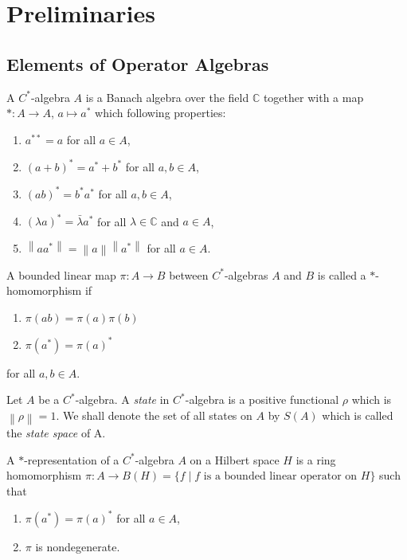 \chapter{Preliminaries}

\section{Elements of Operator Algebras}

A \(C^\ast\)-algebra \(A\) is a Banach algebra over the field \(\mathbb{C}\) together with a map \(\ast: A \to A\), \(a \mapsto a^\ast\) which following properties:
\begin{enumerate}
    \item \(a^{\ast\ast}=a\) for all \(a \in A\),
    \item \((a+b)^\ast=a^\ast+b^\ast\) for all \(a,b \in A\),
    \item \((ab)^\ast = b^\ast a^\ast\) for all \(a,b \in A\),
    \item \((\lambda a)^\ast = \bar{\lambda}a^\ast\) for all \(\lambda \in \mathbb{C}\) and \(a \in A\),
    \item \(\left \lVert aa^\ast \right \rVert = \left \lVert a \right \rVert \left \lVert a^\ast \right \rVert\) for all \(a \in A\).
\end{enumerate}

A bounded linear map \(\pi:A \to B\) between \(C^\ast\)-algebras \(A\) and \(B\) is called a \(\ast\)-homomorphism if
\begin{enumerate}
    \item \(\pi(ab)=\pi(a)\pi(b)\)
    \item \(\pi(a^\ast) = \pi(a)^\ast\)
\end{enumerate}
for all \(a,b \in A\).

Let \(A\) be a \(C^\ast\)-algebra. A \emph{state} in \(C^\ast\)-algebra is a positive functional \(\rho\) which is \(\left \lVert \rho \right \rVert=1\). We shall denote the set of all states on \(A\) by \(S(A)\) which is called the \emph{state space} of A.

A \(\ast\)-representation of a \(C^\ast\)-algebra \(A\) on a Hilbert space \(H\) is a ring homomorphism \(\pi: A \to B(H)=\{f \mid f \mbox{ is a bounded linear operator on }H\}\) such that
\begin{enumerate}
    \item \(\pi(a^\ast)=\pi(a)^\ast\) for all \(a \in A\),
    \item \(\pi\) is nondegenerate.
\end{enumerate}

